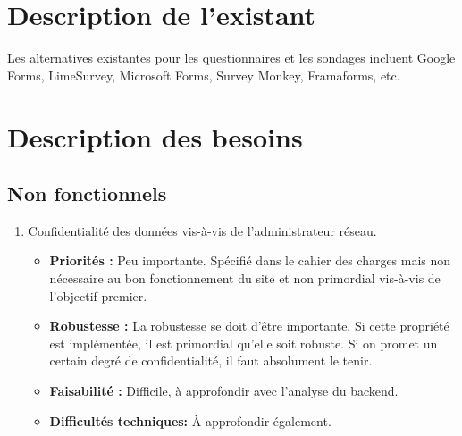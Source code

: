 \documentclass{article}
\begin{document}
\section{Description de l'existant}
Les alternatives existantes pour les questionnaires et les sondages incluent Google Forms, LimeSurvey, Microsoft Forms, Survey Monkey, Framaforms, etc.

\section{Description des besoins}
\subsection{Non fonctionnels}
\begin{enumerate}[noitemsep]
\item Confidentialité des données vis-à-vis de l'administrateur réseau.
\begin{itemize}[noitemsep]
\item \textbf{Priorités : }Peu importante. Spécifié dans le cahier des charges mais non nécessaire au bon fonctionnement du site et non primordial vis-à-vis de l'objectif premier.
\item \textbf{Robustesse : } La robustesse se doit d'être importante. Si cette propriété est implémentée, il est primordial qu'elle soit robuste. Si on promet un certain degré de confidentialité, il faut absolument le tenir.
\item \textbf{Faisabilité : } Difficile, à approfondir avec l'analyse du backend.
\item \textbf{Difficultés techniques: } À approfondir également.
\end{itemize}



\end{enumerate}
\end{document}
